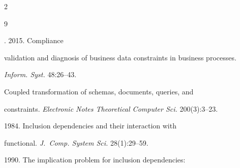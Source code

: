 


















  \begin{multicols}{2}



\renewcommand{\bibname}{\protect\rmfamily References}




{\small\frenchspacing

 {%


 \begin{thebibliography}{9}


. 2015. Compliance

validation and diagnosis of business data constraints in business processes.

\textit{Inform. Syst.} 48:26--43.


 Coupled transformation of schemas, documents, queries, and

constraints. \textit{Electronic Notes Theoretical Computer Sci.} 200(3):3--23.




 1984. Inclusion dependencies and their interaction with

functional. \textit{J.~Comp. System Sci.} 28(1):29--59.


 1990. The implication problem for inclusion dependencies:


\end{thebibliography}}}
\end{multicols}

